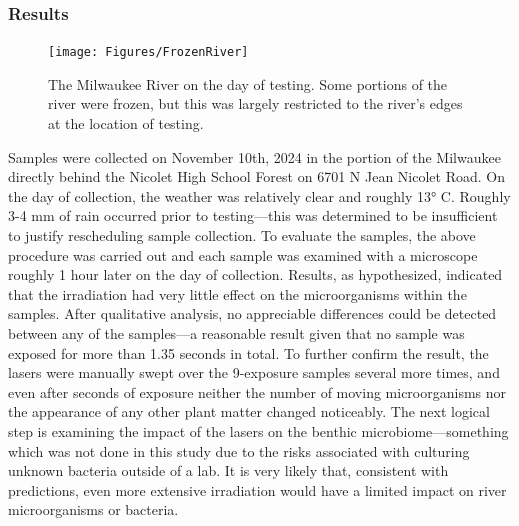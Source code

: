 \documentclass[fleqn,10pt]{SelfArx} %
\begin{document}
	\subsubsection{Results}
	\begin{figure}[h]
		\centering
		\texttt{[image: Figures/FrozenRiver]}
		\caption[Frozen River]{The Milwaukee River on the day of testing. Some portions of the river were frozen, but this was largely restricted to the river's edges at the location of testing.}
		\label{fig:FrozenRiver}
	\end{figure}
	Samples were collected on November 10th, 2024 in the portion of the Milwaukee directly behind the Nicolet High School Forest on 6701 N Jean Nicolet Road. On the day of collection, the weather was relatively clear and roughly 13° C. Roughly 3-4 mm of rain occurred prior to testing—this was determined to be insufficient to justify rescheduling sample collection. To evaluate the samples, the above procedure was carried out and each sample was examined with a microscope roughly 1 hour later on the day of collection. 
	Results, as hypothesized, indicated that the irradiation had very little effect on the microorganisms within the samples. After qualitative analysis, no appreciable differences could be detected between any of the samples—a reasonable result given that no sample was exposed for more than 1.35 seconds in total. To further confirm the result, the lasers were manually swept over the 9-exposure samples several more times, and even after seconds of exposure neither the number of moving microorganisms nor the appearance of any other plant matter changed noticeably. 
	The next logical step is examining the impact of the lasers on the \gls{benthic} microbiome—something which was not done in this study due to the risks associated with culturing unknown bacteria outside of a lab. It is very likely that, consistent with predictions, even more extensive irradiation would have a limited impact on river microorganisms or bacteria. 
	
\end{document}
